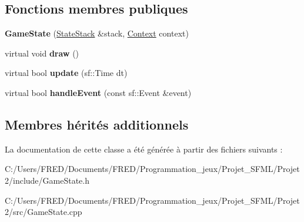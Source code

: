 \subsection*{Fonctions membres publiques}
\begin{DoxyCompactItemize}
\item 
{\bfseries Game\+State} (\hyperlink{class_state_stack}{State\+Stack} \&stack, \hyperlink{struct_state_1_1_context}{Context} context)\hypertarget{class_game_state_aeb2e2598754640c694b989311b1aebfe}{}\label{class_game_state_aeb2e2598754640c694b989311b1aebfe}

\item 
virtual void {\bfseries draw} ()\hypertarget{class_game_state_a3c511417d8934943ae65c04681f321a3}{}\label{class_game_state_a3c511417d8934943ae65c04681f321a3}

\item 
virtual bool {\bfseries update} (sf\+::\+Time dt)\hypertarget{class_game_state_a4ac988f0da5c33b43ff356890fcf9c1c}{}\label{class_game_state_a4ac988f0da5c33b43ff356890fcf9c1c}

\item 
virtual bool {\bfseries handle\+Event} (const sf\+::\+Event \&event)\hypertarget{class_game_state_a000dd3306b1cb9faab5a86774a22aa6d}{}\label{class_game_state_a000dd3306b1cb9faab5a86774a22aa6d}

\end{DoxyCompactItemize}
\subsection*{Membres hérités additionnels}


La documentation de cette classe a été générée à partir des fichiers suivants \+:\begin{DoxyCompactItemize}
\item 
C\+:/\+Users/\+F\+R\+E\+D/\+Documents/\+F\+R\+E\+D/\+Programmation\+\_\+jeux/\+Projet\+\_\+\+S\+F\+M\+L/\+Projet2/include/Game\+State.\+h\item 
C\+:/\+Users/\+F\+R\+E\+D/\+Documents/\+F\+R\+E\+D/\+Programmation\+\_\+jeux/\+Projet\+\_\+\+S\+F\+M\+L/\+Projet2/src/Game\+State.\+cpp\end{DoxyCompactItemize}
